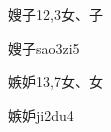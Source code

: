 \begin{entry}{嫂子}{12,3}{⼥、⼦}
  \begin{phonetics}{嫂子}{sao3zi5}
  \end{phonetics}
\end{entry}

\begin{entry}{嫉妒}{13,7}{⼥、⼥}
  \begin{phonetics}{嫉妒}{ji2du4}
  \end{phonetics}
\end{entry}


